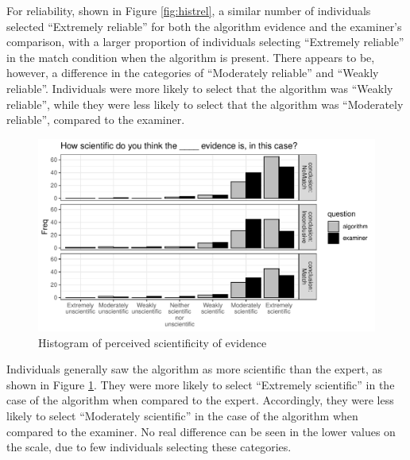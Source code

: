 \documentclass[print]{nuthesis}
\begin{document}
For reliability, shown in Figure \ref{fig:histrel}, a similar number of individuals selected ``Extremely reliable'' for both the algorithm evidence and the examiner's comparison, with a larger proportion of individuals selecting ``Extremely reliable'' in the match condition when the algorithm is present.
There appears to be, however, a difference in the categories of ``Moderately reliable'' and ``Weakly reliable''.
Individuals were more likely to select that the algorithm was ``Weakly reliable'', while they were less likely to select that the algorithm was ``Moderately reliable'', compared to the examiner.

\begin{figure}

{\centering \includegraphics[width=\linewidth]{thesis_files/figure-latex/histsci-1} 

}

\caption{Histogram of perceived scientificity of evidence}\label{fig:histsci}
\end{figure}

Individuals generally saw the algorithm as more scientific than the expert, as shown in Figure \ref{fig:histsci}.
They were more likely to select ``Extremely scientific'' in the case of the algorithm when compared to the expert.
Accordingly, they were less likely to select ``Moderately scientific'' in the case of the algorithm when compared to the examiner.
No real difference can be seen in the lower values on the scale, due to few individuals selecting these categories.
\end{document}

